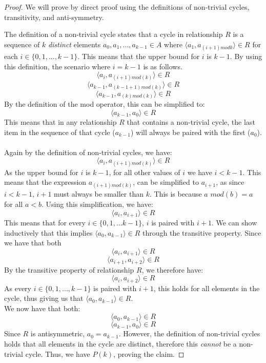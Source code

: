 \documentclass[titlepage]{article}
\begin{document}
\begin{proof}
We will prove by direct proof using the definitions of non-trivial cycles, transitivity, and anti-symmetry.

The definition of a non-trivial cycle states that a cycle in relationship $R$ is a sequence of $k$ \emph{distinct} elements $a_0,a_1,...,a_{k-1} \in A$ where $\langle a_1, a_{(i+1)mod k} \rangle \in R$ for each $i \in \{0,1,...,k-1\}$. This means that the upper bound for $i$ is $k-1$. By using this definition, the scenario where $i=k-1$ is as follows.
$$\langle a_{i},a_{(i+1)mod(k)} \rangle \in R$$
$$\langle a_{k-1},a_{(k-1+1)mod(k)} \rangle \in R$$
$$\langle a_{k-1},a_{(k)mod(k)} \rangle \in R$$
By the definition of the mod operator, this can be simplified to:
$$\langle a_{k-1},a_0 \rangle \in R$$
This means that in any relationship $R$ that contains a non-trivial cycle, the last item in the sequence of that cycle ($a_{k-1}$) will always be paired with the first ($a_0$).
\\
\\
Again by the definition of non-trivial cycles, we have:
$$\langle a_{i},a_{(i+1)mod(k)} \rangle \in R$$
As the upper bound for $i$ is $k-1$, for all other values of $i$ we have $i < k-1$. This means that the expression $a_{(i+1)mod(k)}$, can be simplified to $a_{i+1}$, as since $i < k-1$, $i + 1$ must always be smaller than $k$. This is because $a$  $mod(b) = a$ for all $a < b$. Using this simplification, we have:
$$\langle a_{i},a_{i+1} \rangle \in R$$
This means that for every $i \in \{0,1,...k-1\}$, $i$ is paired with $i+1$. We can show inductively that this implies $\langle a_0, a_{k-1}\rangle \in R$ through the transitive property. Since we have that both
$$\langle a_{i},a_{i+1} \rangle \in R$$
$$\langle a_{i+1},a_{i+2} \rangle \in R$$
By the transitive property of relationship $R$, we therefore have:
$$\langle a_{i},a_{i+2} \rangle \in R$$
As every $i \in \{0,1,...,k-1\}$ is paired with $i+1$, this holds for all elements in the cycle, thus giving us that $\langle a_{0},a_{k-1} \rangle \in R$.
\\
We now have that both:
$$\langle a_0, a_{k-1}\rangle \in R$$
$$\langle a_{k-1},a_0 \rangle \in R$$
Since $R$ is antisymmetric, $a_0 = a_{k-1}$. However, the definition of non-trivial cycles holds that all elements in the cycle are distinct, therefore this \emph{cannot} be a non-trivial cycle. Thus, we have $P(k)$, proving the claim.
\end{proof}
\end{document}
